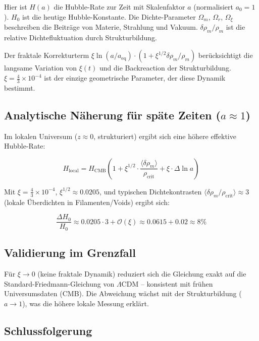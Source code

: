 	Hier ist $H(a)$ die Hubble-Rate zur Zeit mit Skalenfaktor $a$ (normalisiert $a_0 = 1$). $H_0$ ist die heutige Hubble-Konstante. Die Dichte-Parameter $\Omega_m$, $\Omega_r$, $\Omega_\xi$ beschreiben die Beiträge von Materie, Strahlung und Vakuum. $\delta \rho_m / \rho_m$ ist die relative Dichtefluktuation durch Strukturbildung.
	
	Der fraktale Korrekturterm $\xi \ln(a/a_{\text{eq}}) \cdot (1 + \xi^{1/2} \delta \rho_m / \rho_m)$ berücksichtigt die langsame Variation von $\xi(t)$ und die Backreaction der Strukturbildung. $\xi = \frac{4}{3} \times 10^{-4}$ ist der einzige geometrische Parameter, der diese Dynamik bestimmt.
	

	
	\subsection*{Analytische Näherung für späte Zeiten ($a \approx 1$)}
	
	Im lokalen Universum ($z \approx 0$, strukturiert) ergibt sich eine höhere effektive Hubble-Rate:
	
	\begin{equation}
		H_{\text{local}} = H_{\text{CMB}} \left(1 + \xi^{1/2} \cdot \frac{\langle \delta \rho_m \rangle}{\rho_{\text{crit}}} + \xi \cdot \Delta \ln a \right)
	\end{equation}
	
	Mit $\xi = \frac{4}{3} \times 10^{-4}$, $\xi^{1/2} \approx 0.0205$, und typischen Dichtekontrasten $\langle \delta \rho_m / \rho_{\text{crit}} \rangle \approx 3$ (lokale Überdichten in Filamenten/Voids) ergibt sich:
	
	\begin{equation}
		\frac{\Delta H_0}{H_0} \approx 0.0205 \cdot 3 + \mathcal{O}(\xi) \approx 0.0615 + 0.02 \approx 8\% 
	\end{equation}
	

	
	\subsection*{Validierung im Grenzfall}
	
	Für $\xi \to 0$ (keine fraktale Dynamik) reduziert sich die Gleichung exakt auf die Standard-Friedmann-Gleichung von $\Lambda$CDM – konsistent mit frühen Universumsdaten (CMB). Die Abweichung wächst mit der Strukturbildung ($a \to 1$), was die höhere lokale Messung erklärt.
	
	\subsection*{Schlussfolgerung}
	

